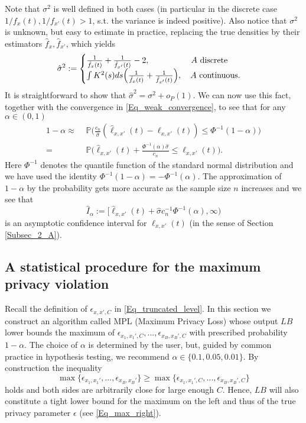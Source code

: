 \documentclass[conference]{IEEEtran}
\begin{document}
Note that $\sigma^2$ is well defined in both cases (in particular in the discrete case $1/f_x(t), 1/f_{x'}(t)>1$, s.t. the variance is indeed positive). Also notice that $\sigma^2$ is unknown, but easy to estimate in practice, replacing the true densities by their estimators $\hat f_x, \hat f_{x'}$, which yields
$$
\hat \sigma^2 := \begin{cases}
\frac{1}{\hat f_x(t)}+\frac{1}{\hat f_{x'}(t)}-2, \quad\quad\quad\quad\quad A \,\, \textnormal{discrete}
\\
\int K^2(s) ds \Big(\frac{1}{\hat f_x(t)}+\frac{1}{\hat f_{x'}(t)} \Big), \quad A \,\, \textnormal{continuous}.
\end{cases}
$$
It is straightforward to show that $\hat \sigma^2 = \sigma^2 +o_P(1)$. We can now use this fact, together with the convergence in \eqref{Eq_weak_convergence}, to see that for any $\alpha \in (0,1)$
\begin{align}\label{Eq_LB}
1-\alpha \approx & \,\, \mathbb{P}  \Big(  \frac{c_n}{\hat \sigma} (\hat \ell_{x,x'}(t)-\ell_{x,x'}(t)) \le \Phi^{-1}(1-\alpha)  \Big)\\
=&\,\, \mathbb{P} \Big( \hat \ell_{x,x'}(t)+\frac{\Phi^{-1}(\alpha) \hat \sigma }{c_n} \le \ell_{x,x'}(t) \Big). \nonumber
\end{align}
Here $\Phi^{-1}$ denotes the quantile function of the standard normal distribution and we have used the identity $\Phi^{-1}(1-\alpha) = -\Phi^{-1}(\alpha)$.
The approximation of $1-\alpha$ by the probability gets more accurate as the sample size $n$ increases and we see that 
$$
\hat I_\alpha := [\hat \ell_{x,x'}(t)+ \hat \sigma c_n^{-1}\Phi^{-1}(\alpha), \infty) 
$$
is an asymptotic confidence interval for $\ell_{x,x'}(t)$ (in the sense of Section \ref{Subsec_2_A}).








\subsection{A statistical procedure for the maximum privacy violation} \label{subsec_43}
Recall the definition of $\epsilon_{x,x',C}$ in \eqref{Eq_truncated_level}. In this section we construct an algorithm called MPL (Maximum Privacy Loss) whose output $LB$ lower bounds  the maximum of $\epsilon_{x_1,x_1',C},...,\epsilon_{x_B,x_B',C}$ with prescribed probability $1-\alpha$. The choice of $\alpha$ is determined by the user, but, guided by common practice in hypothesis testing, we recommend $\alpha \in \{0.1, 0.05, 0.01\}$. By construction the inequality $$
\max\{\epsilon_{x_1,x_1'},...,\epsilon_{x_B,x_B'} \} \ge \max\{\epsilon_{x_1,x_1',C},...,\epsilon_{x_B,x_B',C} \}
$$
holds and both sides are arbitrarily close for large enough $C$. Hence, $LB$ will also constitute a tight lower bound for the maximum on the left and thus of the true privacy parameter $\epsilon$ (see \eqref{Eq_max_right}).
\end{document}
